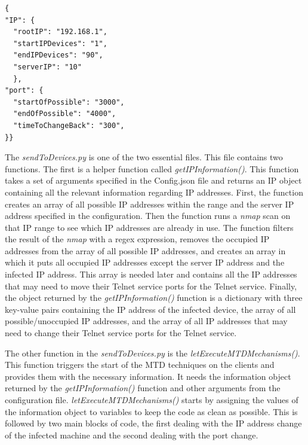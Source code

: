 \setcounter{temp}{\value{lstlisting}}
\setcounter{lstlisting}{0}
\renewcommand{\lstlistingname}{Listing}

\begin{lstlisting}[caption={The Configuration File in Which the MTD Values can be Specified.},label={lst:Config}]
{
"IP": {
  "rootIP": "192.168.1",
  "startIPDevices": "1",
  "endIPDevices": "90",
  "serverIP": "10"
  },
"port": {
  "startOfPossible": "3000",
  "endOfPossible": "4000",
  "timeToChangeBack": "300",
}}
\end{lstlisting}

\setcounter{lstlisting}{\value{temp}}
\renewcommand{\lstlistingname}{Algorithm}

The \textit{sendToDevices.py} is one of the two essential files. This file contains two functions. The first is a helper function called \textit{getIPInformation()}. This function takes a set of arguments specified in the Config.json file and returns an IP object containing all the relevant information regarding IP addresses. First, the function creates an array of all possible IP addresses within the range and the server IP address specified in the configuration. Then the function runs a \textit{nmap} scan on that IP range to see which IP addresses are already in use. The function filters the result of the \textit{nmap} with a regex expression, removes the occupied IP addresses from the array of all possible IP addresses, and creates an array in which it puts all occupied IP addresses except the server IP address and the infected IP address. This array is needed later and contains all the IP addresses that may need to move their Telnet service ports for the Telnet service. Finally, the object returned by the \textit{getIPInformation()} function is a dictionary with three key-value pairs containing the IP address of the infected device, the array of all possible/unoccupied IP addresses, and the array of all IP addresses that may need to change their Telnet service ports for the Telnet service.

The other function in the \textit{sendToDevices.py} is the \textit{letExecuteMTDMechanisms()}. This function triggers the start of the MTD techniques on the clients and provides them with the necessary information. It needs the information object returned by the \textit{getIPInformation()} function and other arguments from the configuration file. \textit{letExecuteMTDMechanisms()} starts by assigning the values of the information object to variables to keep the code as clean as possible. This is followed by two main blocks of code, the first dealing with the IP address change of the infected machine and the second dealing with the port change.


